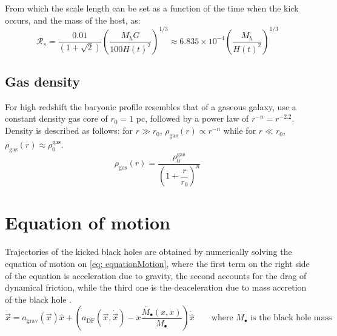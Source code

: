 			From which the scale length can be set as a function of the time when the kick occurs, and the mass of the host, as:
			\begin{equation}
				\mathcal{R}_s = \dfrac{0.01}{\left(1 + \sqrt{2}\right)}\left({\dfrac{M_hG}{100 H(t)^2}}\right)^{1/3} \approx 6.835\times 10^{-4}\left({\dfrac{M_h}{H(t)^2}}\right)^{1/3}
			\end{equation}
		\subsection{Gas density}
			For high redshift the baryonic profile resembles that of a gaseous galaxy, \citeauthor{choksi2017recoiling} use a constant density gas core of $r_0 = 1$ pc, followed by a power law of $r^{-n} = r^{-2.2}$. Density is described as follows: for $r \gg r_0$, $\rho_\text{gas}(r)\propto r^{-n}$ while for $r \ll r_0$, $\rho_\text{gas}(r) \approx \rho_0^\text{gas}$.
			\begin{equation}\label{eq: rdensity}
				\rho_\text{gas}(r) = \dfrac{\rho_0^\text{gas}}{\left(1 + \dfrac{r}{r_0}\right)^n}
			\end{equation}
	
	\section{Equation of motion}
		Trajectories of the kicked black holes are obtained by numerically solving the equation of motion on \autoref{eq: equationMotion}, where the first term on the right side of the equation is acceleration due to gravity, the second accounts for the drag of dynamical friction, while the third one is the deaceleration due to mass accretion of the black hole \cite{tanaka2009assembly, choksi2017recoiling}.
		\begin{equation}\label{eq: equationMotion}
			\ddot{\vec{x}} = a_\text{grav}(\vec{x})\hat{x} + \left(a_\text{DF}(\vec{x}, \dot{\vec{x}})-\dot{x}\dfrac{\dot{M_\bullet}(x, \dot{x})}{M_\bullet}\right)\dot{\hat{x}} \qquad \text{where $M_\bullet$ is the black hole mass}
		\end{equation}
		
